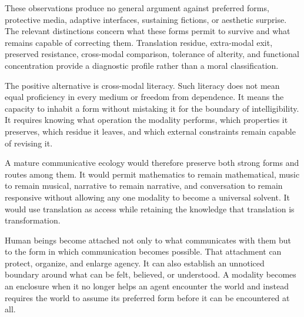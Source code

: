 \documentclass[11pt]{article}
\begin{document}
These observations produce no general argument against preferred forms,
protective media, adaptive interfaces, sustaining fictions, or aesthetic
surprise. The relevant distinctions concern what these forms permit to
survive and what remains capable of correcting them. Translation residue,
extra-modal exit, preserved resistance, cross-modal comparison, tolerance of
alterity, and functional concentration provide a diagnostic profile rather
than a moral classification.

The positive alternative is cross-modal literacy. Such literacy does not mean
equal proficiency in every medium or freedom from dependence. It means the
capacity to inhabit a form without mistaking it for the boundary of
intelligibility. It requires knowing what operation the modality performs,
which properties it preserves, which residue it leaves, and which external
constraints remain capable of revising it.

A mature communicative ecology would therefore preserve both strong forms and
routes among them. It would permit mathematics to remain mathematical, music
to remain musical, narrative to remain narrative, and conversation to remain
responsive without allowing any one modality to become a universal solvent.
It would use translation as access while retaining the knowledge that
translation is transformation.

Human beings become attached not only to what communicates with them but to
the form in which communication becomes possible. That attachment can protect,
organize, and enlarge agency. It can also establish an unnoticed boundary
around what can be felt, believed, or understood. A modality becomes an
enclosure when it no longer helps an agent encounter the world and instead
requires the world to assume its preferred form before it can be encountered
at all.

\newpage
\end{document}

